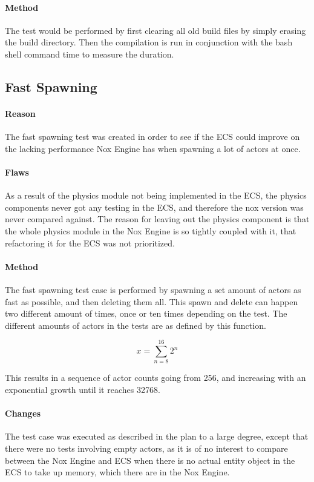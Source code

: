\paragraph{Method}
The test would be performed by first clearing all old build files by simply erasing the build directory.
Then the compilation is run in conjunction with the bash shell command time to measure the duration.

\subsection{Fast Spawning}
\paragraph{Reason}
The fast spawning test was created in order to see if the ECS could improve on the lacking performance Nox Engine has when spawning a lot of actors at once.

\paragraph{Flaws}
As a result of the physics module not being implemented in the ECS, the physics components never got any testing in the ECS, and therefore the nox version was never compared against.
The reason for leaving out the physics component is that the whole physics module in the Nox Engine is so tightly coupled with it, that refactoring it for the ECS was not prioritized.

\paragraph{Method}
The fast spawning test case is performed by spawning a set amount of actors as fast as possible, and then deleting them all.
This spawn and delete can happen two different amount of times, once or ten times depending on the test.
The different amounts of actors in the tests are as defined by this function.

\begin{equation}
x = \sum_{n=8}^{16} 2^{n}
\end{equation}

This results in a sequence of actor counts going from 256, and increasing with an exponential growth until it reaches 32768.

\paragraph{Changes}
The test case was executed as described in the plan to a large degree, except that there were no tests involving empty actors, as it is of no interest to compare between the Nox Engine and ECS when there is no actual entity object in the ECS to take up memory, which there are in the Nox Engine.

